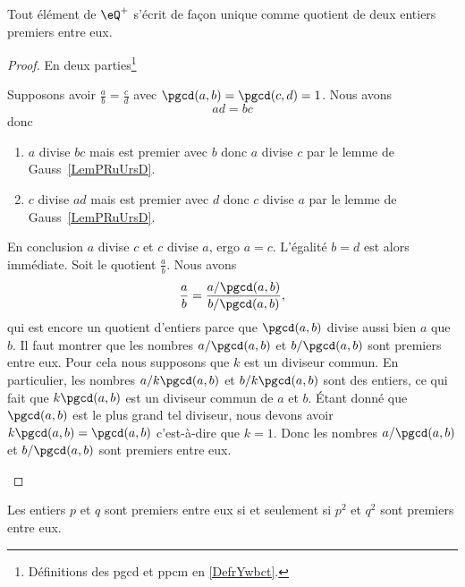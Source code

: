 \begin{theorem}     \label{THOooWYQVooRBaAAM}
	Tout élément de \( \eQ^+\) s'écrit de façon unique comme quotient de deux entiers premiers entre eux.
\end{theorem}

\begin{proof}
	En deux parties\footnote{Définitions des pgcd et ppcm en \ref{DefrYwbct}.}
	\begin{subproof}
		\spitem[Unicité]
		Supposons avoir \( \frac{ a }{ b }=\frac{ c }{ d }\) avec \( \pgcd(a,b)=\pgcd(c,d)=1\). Nous avons
		\begin{equation}
			ad=bc
		\end{equation}
		donc
		\begin{enumerate}
			\item
			      \( a\) divise \( bc\) mais est premier avec \( b\) donc \( a\) divise \( c\) par le lemme de Gauss~\ref{LemPRuUrsD}.
			\item
			      \( c\) divise \( ad\) mais est premier avec \( d\) donc \( c\) divise \( a\) par le lemme de Gauss~\ref{LemPRuUrsD}.
		\end{enumerate}
		En conclusion \( a\) divise \( c\) et \( c\) divise \( a\), ergo \( a=c\). L'égalité \( b=d\) est alors immédiate.
		\spitem[Existence]
		Soit le quotient \( \frac{ a }{ b }\). Nous avons
		\begin{equation}
			\frac{ a }{ b }=\frac{ a/\pgcd(a,b) }{ b/\pgcd(a,b) },
		\end{equation}
		qui est encore un quotient d'entiers parce que \( \pgcd(a,b)\) divise aussi bien \( a\) que \( b\). Il faut montrer que les nombres \( a/\pgcd(a,b)\) et \( b/\pgcd(a,b)\) sont premiers entre eux. Pour cela nous supposons que \( k\) est un diviseur commun. En particulier, les nombres \( a/k\pgcd(a,b)\) et \( b/k\pgcd(a,b)\) sont des entiers, ce qui fait que \( k\pgcd(a,b)\) est un diviseur commun de \( a\) et \( b\). Étant donné que \( \pgcd(a,b)\) est le plus grand tel diviseur, nous devons avoir \( k\pgcd(a,b)=\pgcd(a,b)\) c'est-à-dire que \( k=1\). Donc les nombres \( a/\pgcd(a,b)\) et \( b/\pgcd(a,b)\) sont premiers entre eux.
	\end{subproof}
\end{proof}

\begin{proposition}     \label{PROPooRZDDooLJabov}
	Les entiers \( p\) et \( q\) sont premiers entre eux si et seulement si \( p^2\) et \( q^2\) sont premiers entre eux.
\end{proposition}

